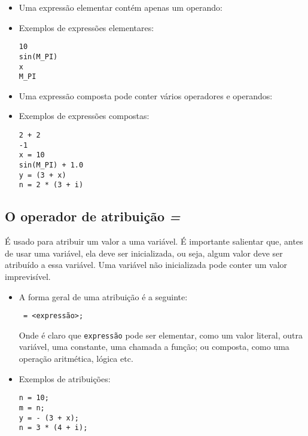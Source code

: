 \documentclass{book}
\begin{document}
\begin{itemize}
\item Uma expressão elementar contém apenas um operando:

\item Exemplos de expressões elementares:
\begin{lstlisting}
10
sin(M_PI)
x
M_PI
\end{lstlisting}

\item Uma expressão composta pode conter vários operadores e operandos:

\item Exemplos de expressões compostas:
\begin{lstlisting}
2 + 2
-1
x = 10
sin(M_PI) + 1.0
y = (3 + x)
n = 2 * (3 + i)
\end{lstlisting}


\end{itemize}

\subsection{O operador de atribuição \emph{=}}

É usado para atribuir um valor a uma variável. É importante salientar que, antes de usar uma variável, ela deve ser inicializada, ou seja, algum valor deve ser atribuído a essa variável. Uma variável não inicializada pode conter um valor imprevisível.

\begin{itemize}
\item A forma geral de uma atribuição é a seguinte:

{\tt <identificador da variável> = <expressão>;}

Onde é claro que {\tt expressão} pode ser elementar, como um valor literal, outra variável, uma constante, uma chamada a função; ou composta, como uma operação aritmética, lógica etc.

\item Exemplos de atribuições:
\begin{lstlisting}
n = 10;
m = n;
y = - (3 + x);
n = 3 * (4 + i);
\end{lstlisting}

\end{itemize}
\end{document}
